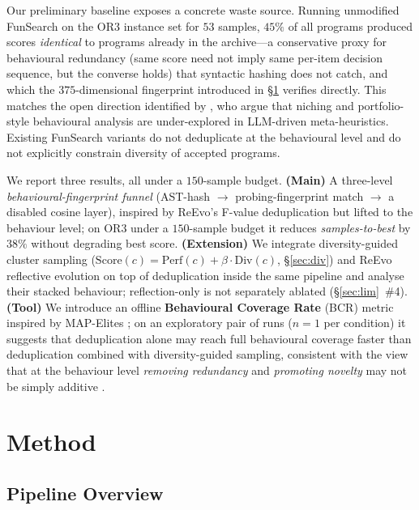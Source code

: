 \documentclass{article}
\begin{document}
Our preliminary baseline exposes a concrete waste source. Running unmodified FunSearch
on the OR3 instance set for $53$ samples, $45\%$ of all programs produced scores
\emph{identical} to programs already in the archive---a conservative proxy for
behavioural redundancy (same score need not imply same per-item decision sequence,
but the converse holds) that syntactic hashing does not catch, and which the
$375$-dimensional fingerprint introduced in \S\ref{sec:method} verifies directly. This matches
the open direction identified by \citet{vanstein2025llm}, who argue that niching and
portfolio-style behavioural analysis are under-explored in LLM-driven
meta-heuristics. Existing FunSearch variants do not deduplicate at the behavioural
level and do not explicitly constrain diversity of accepted programs.

We report three results, all under a $150$-sample budget. \textbf{(Main)} A three-level
\emph{behavioural-fingerprint funnel} (AST-hash $\to$ probing-fingerprint match $\to$
a disabled cosine layer), inspired by ReEvo's F-value deduplication
\citep{ye2024reevo} but lifted to the behaviour level; on OR3 under a $150$-sample
budget it reduces \emph{samples-to-best} by $38\%$ without degrading best score.
\textbf{(Extension)} We integrate diversity-guided cluster sampling
($\mathrm{Score}(c)=\mathrm{Perf}(c)+\beta\cdot\mathrm{Div}(c)$, \S\ref{sec:div})
and ReEvo reflective evolution on top of deduplication inside the same pipeline
and analyse their stacked behaviour; reflection-only is not separately ablated
(\S\ref{sec:lim}~\#4). \textbf{(Tool)} We introduce an offline \textbf{Behavioural Coverage Rate} (BCR)
metric inspired by MAP-Elites \citep{mouret2015illuminating}; on an exploratory
pair of runs ($n{=}1$ per condition) it suggests that deduplication alone may
reach full behavioural coverage faster than deduplication combined with
diversity-guided sampling, consistent with the view that at the behaviour level
\emph{removing redundancy} and \emph{promoting novelty} may not be simply additive
\citep{vanstein2025llm}.

\section{Method}
\label{sec:method}

\subsection{Pipeline Overview}
\label{sec:pipeline}
\end{document}
